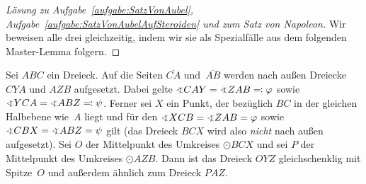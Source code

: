 \begin{proof}[Lösung zu Aufgabe~\ref{aufgabe:SatzVonAubel}, Aufgabe~\ref{aufgabe:SatzVonAubelAufSteroiden} und zum Satz von Napoleon]
	Wir beweisen alle drei gleichzeitig, indem wir sie als Spezialfälle aus dem folgenden Master-Lemma folgern.
\end{proof}
\begin{satzmitnamen}
	Sei $ABC$ ein Dreieck. Auf die Seiten $\overline{CA}$ und~$\overline{AB}$ werden nach außen Dreiecke $CYA$ und $AZB$ aufgesetzt. Dabei gelte $\winkel CAY=\winkel ZAB\eqqcolon\varphi$ sowie $\winkel YCA=\winkel ABZ\eqqcolon\psi$. Ferner sei $X$ ein Punkt, der bezüglich $BC$ in der gleichen Halbebene wie~$A$ liegt und für den $\winkel XCB=\winkel ZAB=\varphi$ sowie $\winkel CBX=\winkel ABZ=\psi$ gilt (das Dreieck $BCX$ wird also \emph{nicht} nach außen aufgesetzt). Sei $O$ der Mittelpunkt des Umkreises $\odot BCX$ und sei $P$ der Mittelpunkt des Umkreises $\odot AZB$. Dann ist das Dreieck $OYZ$ gleichschenklig mit Spitze~$O$ und außerdem ähnlich zum Dreieck $PAZ$.
\end{satzmitnamen}
